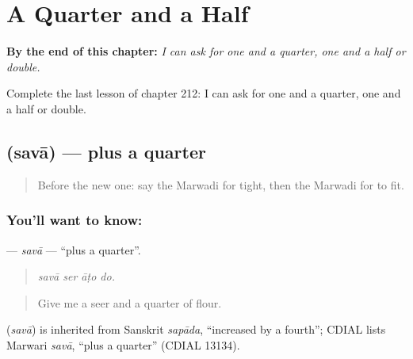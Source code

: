 
\chapter{A Quarter and a Half}
\label{ch:mw-a-quarter-and-a-half}

\begin{chapteropening}
\textbf{By the end of this chapter:} \emph{I can ask for one and a quarter, one and a half or double.}

Complete the last lesson of chapter 212: I can ask for one and a quarter, one and a half or double.
\end{chapteropening}

\section[\texorpdfstring{\mw{सवा} (savā)}{सवा (savā)}]{ (savā) — plus a quarter}

\label{lesson:MW-C212-sava}



\begin{quote}
Before the new one: say the Marwadi for tight, then the Marwadi for to fit.
\end{quote}

\subsection*{You'll want to know: }
\textbf{} — \emph{savā} — \textquotedblleft{}plus a quarter\textquotedblright{}.

\begin{quote}
   
\end{quote}

\begin{quote}
\emph{savā ser āṭo do.}
\end{quote}

\begin{quote}
Give me a seer and a quarter of flour.
\end{quote}

\begin{cousinweb}
\textbf{} (\emph{savā}) is inherited from Sanskrit \emph{sapāda}, \textquotedblleft{}increased by a fourth\textquotedblright{}; CDIAL lists Marwari \emph{savā}, \textquotedblleft{}plus a quarter\textquotedblright{} (CDIAL 13134).
\end{cousinweb}

